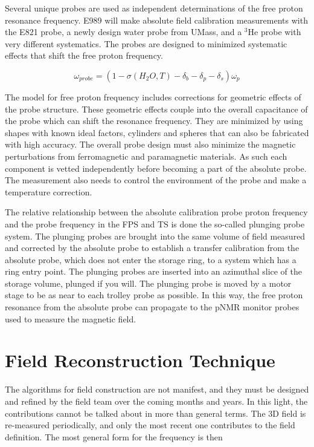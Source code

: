 Several unique probes are used as independent determinations of the free proton resonance frequency.  E989 will make absolute field calibration measurements with the E821 probe, a newly design water probe from UMass, and a $\mathrm{^3He}$ probe with very different systematics. The probes are designed to minimized systematic effects that shift the free proton frequency.

\begin{equation}
\label{eqn:nmr-effects-model}
\omega_{probe} = (1 - \sigma(H_2 O, T) - \delta_b - \delta_p - \delta_s) \omega_p
\end{equation}

The model for free proton frequency includes corrections for geometric effects of the probe structure.  These geometric effects couple into the overall capacitance of the probe which can shift the resonance frequency.  They are minimized by using shapes with known ideal factors, cylinders and spheres that can also be fabricated with high accuracy.  The overall probe design must also minimize the magnetic perturbations from ferromagnetic and paramagnetic materials.  As such each component is vetted independently before becoming a part of the absolute probe.  The measurement also needs to control the environment of the probe and make a temperature correction.


The relative relationship between the absolute calibration probe proton frequency and the probe frequency in the FPS and TS is done the so-called plunging probe system.  The plunging probes are brought into the same volume of field measured and corrected by the absolute probe to establish a transfer calibration from the absolute probe, which does not enter the storage ring, to a system which has a ring entry point.  The plunging probes are inserted into an azimuthal slice of the storage volume, plunged if you will.  The plunging probe is moved by a motor stage to be as near to each trolley probe as possible.  In this way, the free proton resonance from the absolute probe can propagate to the pNMR monitor probes used to measure the \gmtwo magnetic field.

\section{Field Reconstruction Technique}

The algorithms for field construction are not manifest, and they must be designed and refined by the field team over the coming months and years.  In this light, the contributions cannot be talked about in more than general terms.  The 3D field is re-measured periodically, and only the most recent one contributes to the field definition. The most general form for the frequency is then

